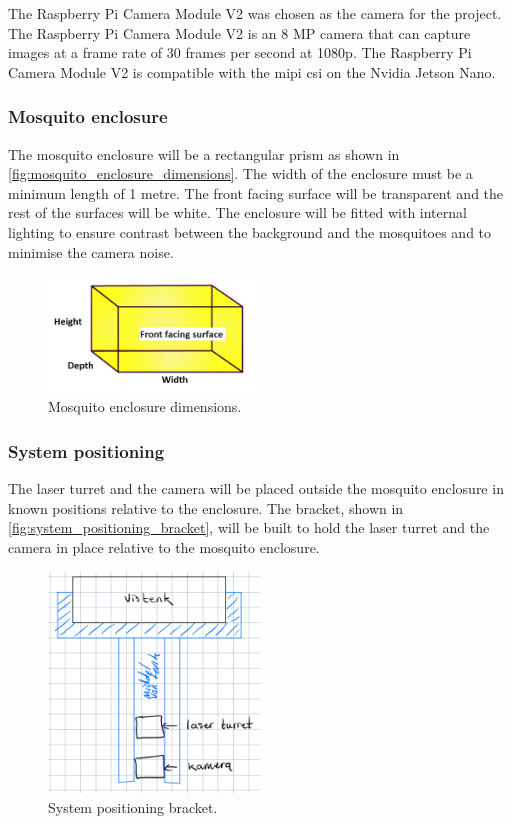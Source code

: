 The Raspberry Pi Camera Module V2 was chosen as the camera for the project. The Raspberry Pi Camera Module V2 is an 8 MP camera that can capture images at a frame rate of 30 frames per second at 1080p. The Raspberry Pi Camera Module V2 is compatible with the \gls{mipi} \gls{csi} on the Nvidia Jetson Nano.



\subsubsection{Mosquito enclosure}
The mosquito enclosure will be a rectangular prism as shown in \autoref{fig:mosquito_enclosure_dimensions}. The width of the enclosure must be a minimum length of 1 metre. The front facing surface will be transparent and the rest of the surfaces will be white. The enclosure will be fitted with internal lighting to ensure contrast between the background and the mosquitoes and to minimise the camera noise.
\begin{figure}[h]
    \centering
    \includegraphics[width=0.5\textwidth]{figures/hardware_design/rectangular_prism.png}
    \caption{Mosquito enclosure dimensions.}
    \label{fig:mosquito_enclosure_dimensions}
\end{figure}



\subsubsection{System positioning}
The laser turret and the camera will be placed outside the mosquito enclosure in known positions relative to the enclosure. The bracket, shown in \autoref{fig:system_positioning_bracket}, will be built to hold the laser turret and the camera in place relative to the mosquito enclosure.
\begin{figure}[h]
    \centering
    \includegraphics[width=0.5\textwidth]{figures/hardware_design/positioning_bracket.png}
    \caption{System positioning bracket.}
    \label{fig:system_positioning_bracket}
\end{figure}



